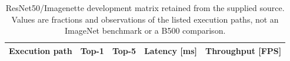 \begin{table}[H]
\centering
\footnotesize
\TableSetup
\caption{ResNet50/Imagenette development matrix retained from the supplied source. Values are fractions and observations of the listed execution paths, not an ImageNet benchmark or a B500 comparison.}
\label{tab:evaluation:resnet50_matrix_validated}
\begin{tabularx}{\linewidth}{@{}YR{1.1cm}R{1.1cm}R{2.3cm}R{2.4cm}@{}}
\toprule
\textbf{Execution path} & \textbf{Top-1} & \textbf{Top-5} & \textbf{Latency [ms]} & \textbf{Throughput [FPS]} \\
\midrule
\bottomrule
\end{tabularx}
\end{table}
